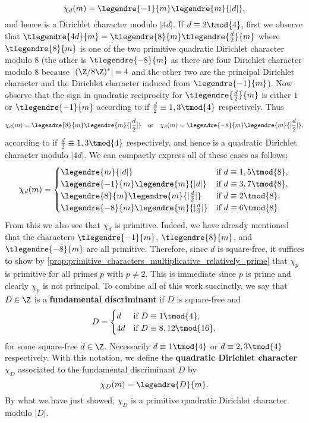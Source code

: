       \[
        \chi_{d}(m) = \legendre{-1}{m}\legendre{m}{|d|},
      \]
      and hence is a Dirichlet character modulo $|4d|$. If $d \equiv 2 \tmod{4}$, first we observe that $\tlegendre{4d}{m} = \tlegendre{8}{m}\tlegendre{\frac{d}{2}}{m}$ where $\tlegendre{8}{m}$ is one of the two primitive quadratic Dirichlet character modulo $8$ (the other is $\tlegendre{-8}{m}$ as there are four Dirichlet character modulo $8$ because $|(\Z/8\Z)^{\ast}| = 4$ and the other two are the principal Dirichlet character and the Dirichlet character induced from $\legendre{-1}{m}$). Now observe that the sign in quadratic reciprocity for $\tlegendre{\frac{d}{2}}{m}$ is either $1$ or $\tlegendre{-1}{m}$ according to if $\frac{d}{2} \equiv 1,3 \tmod{4}$ respectively. Thus
      \[
        \chi_{d}(m) = \legendre{8}{m}\legendre{m}{|\frac{d}{2}|} \quad \text{or} \quad \chi_{d}(m) = \legendre{-8}{m}\legendre{m}{|\frac{d}{2}|},
      \]
      according to if $\frac{d}{2} \equiv 1,3 \tmod{4}$ respectively, and hence is a quadratic Dirichlet character modulo $|4d|$. We can compactly express all of these cases as follows:
      \[
        \chi_{d}(m) = \begin{cases} \legendre{m}{|d|} & \text{if $d \equiv 1,5 \tmod{8}$}, \\ \legendre{-1}{m}\legendre{m}{|d|} & \text{if $d \equiv 3,7 \tmod{8}$}, \\ \legendre{8}{m}\legendre{m}{|\frac{d}{2}|} & \text{if $d \equiv 2 \tmod{8}$}, \\ \legendre{-8}{m}\legendre{m}{|\frac{d}{2}|} & \text{if $d \equiv 6 \tmod{8}$}. \end{cases}
      \]
      From this we also see that $\chi_{d}$ is primitive. Indeed, we have already mentioned that the characters $\tlegendre{-1}{m}$, $\tlegendre{8}{m}$, and $\tlegendre{-8}{m}$ are all primitive. Therefore, since $d$ is square-free, it suffices to show by \cref{prop:primitive_characters_multiplicative_relatively_prime} that $\chi_{p}$ is primitive for all primes $p$ with $p \neq 2$. This is immediate since $p$ is prime and clearly $\chi_{p}$ is not principal. To combine all of this work succinctly, we say that $D \in \Z$ is a \textbf{fundamental discriminant} if $D$ is square-free and
      \[
        D = \begin{cases} d & \text{if $D \equiv 1 \tmod{4}$}, \\ 4d & \text{if $D \equiv 8,12 \tmod{16}$}, \end{cases}
      \]
      for some square-free $d \in \Z$. Necessarily $d \equiv 1 \tmod{4}$ or $d \equiv 2,3 \tmod{4}$ respectively. With this notation, we define the \textbf{quadratic Dirichlet character} $\chi_{D}$ associated to the fundamental discriminant $D$ by
      \[
        \chi_{D}(m) = \legendre{D}{m}.
      \]
      By what we have just showed, $\chi_{D}$ is a primitive quadratic Dirichlet character modulo $|D|$.
